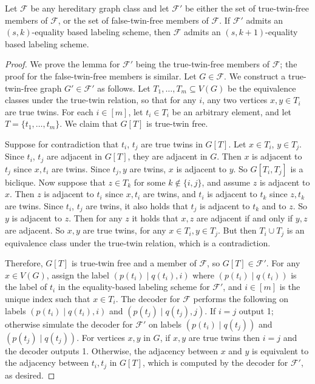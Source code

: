 \documentclass{article}
\newcommand\eqLabelSep{\mathbin|}
\newcommand{\cF}{\ensuremath{\mathcal{F}}}
\begin{document}
\begin{lemma}
\label{lemma:true-twin reduction}
Let $\cF$ be any hereditary graph class and let $\cF'$ be either the set of true-twin-free members
of $\cF$, or the set of false-twin-free members of $\cF$. If $\cF'$ admits an $(s,k)$-equality based
labeling scheme, then $\cF$ admits an $(s,k+1)$-equality based labeling scheme.
\end{lemma}
\begin{proof}
We prove the lemma for $\cF'$ being the true-twin-free members of $\cF$; the proof for the
false-twin-free members is similar.  Let $G \in \cF$. We construct a true-twin-free graph $G' \in
\cF'$ as follows. Let $T_1, \dotsc, T_m \subseteq V(G)$ be the equivalence classes under the
true-twin relation, so that for any $i$, any two vertices $x,y \in T_i$ are true twins. For each $i \in
[m]$, let $t_i \in T_i$ be an arbitrary element, and let $T = \{t_1, \dotsc, t_m\}$. We claim that
$G[T]$ is true-twin free.

Suppose for contradiction that $t_i$, $t_j$ are true twins in $G[T]$. Let $x \in T_i$, $y \in T_j$.
Since $t_i$, $t_j$ are adjacent in $G[T]$, they are adjacent in $G$. Then $x$ is adjacent to $t_j$
since $x,t_i$ are twins. Since $t_j,y$ are twins, $x$ is adjacent to $y$. So $G[T_i,T_j]$ is a
biclique. Now suppose that $z \in T_k$ for some $k \notin \{i,j\}$, and assume $z$ is adjacent to
$x$. Then $z$ is adjacent to $t_i$ since $x, t_i$ are twins, and $t_i$ is adjacent to $t_k$ since
$z, t_k$ are twins. Since $t_i$, $t_j$ are twins, it also holds that $t_j$ is adjacent to $t_k$ and
to $z$. So $y$ is adjacent to $z$. Then for any $z$ it holds that $x,z$ are adjacent if and only if
$y,z$ are adjacent. So $x,y$ are true twins, for any $x \in T_i, y \in T_j$. But then $T_i \cup T_j$
is an equivalence class under the true-twin relation, which is a contradiction.

Therefore, $G[T]$ is true-twin free and a member of $\cF$, so $G[T] \in \cF'$. For any $x \in V(G)$,
assign the label $( p(t_i) \eqLabelSep q(t_i), i )$ where $( p(t_i) \eqLabelSep q(t_i) )$ is the label of $t_i$ in
the equality-based labeling scheme for $\cF'$, and $i \in [m]$ is the unique index such that $x \in
T_i$. The decoder for $\cF$ performs the following on labels $( p(t_i) \eqLabelSep q(t_i), i)$ and
$( p(t_j) \eqLabelSep q(t_j), j)$. If $i = j$ output 1; otherwise simulate the decoder for $\cF'$ on
labels $(p(t_i) \eqLabelSep q(t_j))$ and $(p(t_j) \eqLabelSep q(t_j) )$. For vertices $x,y$ in $G$, if $x,y$ are
true twins then $i=j$ and the decoder outputs 1. Otherwise, the adjacency between $x$ and $y$ is
equivalent to the adjacency between $t_i,t_j$ in $G[T]$, which is computed by the decoder for
$\cF'$, as desired.
\end{proof}
\end{document}
